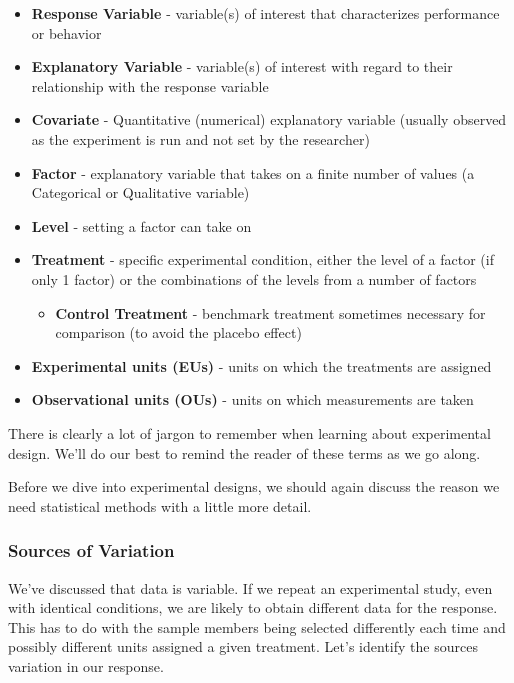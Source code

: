 \documentclass[
]{book}
\providecommand{\tightlist}{%
  \setlength{\itemsep}{0pt}\setlength{\parskip}{0pt}}
\theoremstyle{definition}
\theoremstyle{definition}
\theoremstyle{definition}
\theoremstyle{remark}
\begin{document}
\begin{itemize}
\tightlist
\item
  \textbf{Response Variable} - variable(s) of interest that characterizes performance or behavior\\
\item
  \textbf{Explanatory Variable} - variable(s) of interest with regard to their relationship with the response variable\\
\item
  \textbf{Covariate} - Quantitative (numerical) explanatory variable (usually observed as the experiment is run and not set by the researcher)\\
\item
  \textbf{Factor} - explanatory variable that takes on a finite number of values (a Categorical or Qualitative variable)
\item
  \textbf{Level} - setting a factor can take on
\item
  \textbf{Treatment} - specific experimental condition, either the level of a factor (if only 1 factor) or the combinations of the levels from a number of factors

  \begin{itemize}
  \tightlist
  \item
    \textbf{Control Treatment} - benchmark treatment sometimes necessary for comparison (to avoid the placebo effect)\\
  \end{itemize}
\item
  \textbf{Experimental units (EUs)} - units on which the treatments are assigned\\
\item
  \textbf{Observational units (OUs)} - units on which measurements are taken
\end{itemize}

There is clearly a lot of jargon to remember when learning about experimental design. We'll do our best to remind the reader of these terms as we go along.

Before we dive into experimental designs, we should again discuss the reason we need statistical methods with a little more detail.

\hypertarget{sources-of-variation}{%
\subsubsection{Sources of Variation}\label{sources-of-variation}}

We've discussed that data is variable. If we repeat an experimental study, even with identical conditions, we are likely to obtain different data for the response. This has to do with the sample members being selected differently each time and possibly different units assigned a given treatment. Let's identify the sources variation in our response.
\end{document}
